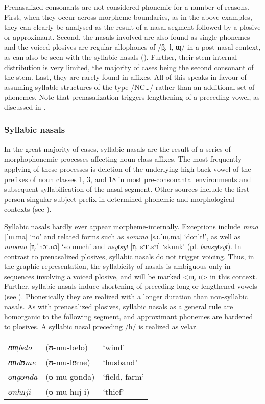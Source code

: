 Prenasalized consonants are not considered phonemic for a number of reasons. First, when they occur across morpheme boundaries, as in the above examples, they can clearly be analysed as the result of a nasal segment followed by a plosive or approximant. Second, the nasals involved are also found as single phonemes and the voiced plosives are regular allophones of /β̞, l, ɰ/ in a post-nasal context, as can also be seen with the syllabic nasals (). Further, their stem-internal distribution is very limited, the majority of cases being the second consonant of the stem. Last, they are rarely found in affixes. All of this speaks in favour of assuming syllable structures of the type /NC\ldots / rather than an additional set of phonemes. Note that prenasalization triggers lengthening of a preceding vowel, as discussed in .

\subsubsection{Syllabic nasals}\label{SyllabicNasals}
In the great majority of cases, syllabic nasals are the result of a series of morphophonemic processes affecting noun class affixes. The most frequently applying of these processes is deletion of the underlying high back vowel of the prefixes of noun classes 1, 3, and 18 in most pre-consonantal environments and subsequent syllabification of the nasal segment. Other sources include the first person singular subject prefix in determined phonemic and morphological contexts (see ).

Syllabic nasals hardly ever appear morpheme-internally. Exceptions include \textit{mma} [ˈm̩.ma] `no' and related forms such as \textit{somma} [sɔ.ˈm̩.ma] `don't!', as well as \textit{nnoono} [n̩.ˈnɔː.nɔ] `so much' and \textit{nsyɪsyɪ} [n̩.ˈsʸɪˑ.sʸɪ] `skunk' (pl. \textit{bansyɪsyɪ}). In contrast to prenasalized plosives, syllabic nasals do not trigger voicing. Thus, in the graphic representation, the syllabicity of nasals is ambiguous only in sequences involving a voiced plosive, and will be marked <m̩, n̩> in this context. Further, syllabic nasals induce shortening of preceding long or lengthened vowels (see ). Phonetically they are realized with a longer duration than non-syllabic nasals. As with prenasalized plosives, syllabic nasals as a general rule are homorganic to the following segment, and approximant phonemes are hardened to plosives. A syllabic nasal preceding /h/ is realized as velar. 
\begin{exe}
	\ex\begin{tabular}[t]{lll}
		\textit{ʊm̩belo}&(\degree ʊ-mu-belo)&`wind'\\
		\textit{ʊn̩dʊme}&(\degree ʊ-mu-lʊme)&`husband'\\
		\textit{ʊn̩gʊnda}&(\degree ʊ-mu-gʊnda)&`field, farm'\\
		\textit{ʊnhɪɪji}&(\degree ʊ-mu-hɪɪj-i)&`thief'
	\end{tabular}
\end{exe}
